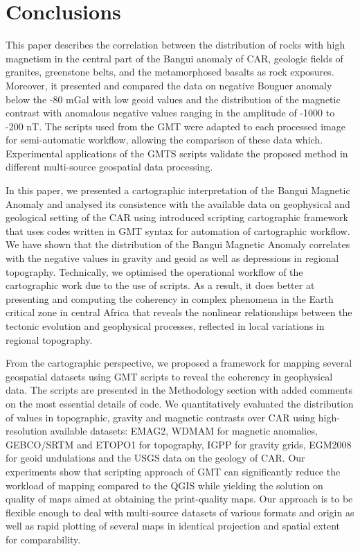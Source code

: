 \documentclass[minerals,article,submit,pdftex,moreauthors]{Definitions/mdpi}
\begin{document}
\section{Conclusions}

This paper describes the correlation between the distribution of rocks with high magnetism in the central part of the Bangui anomaly of CAR, geologic fields of granites, greenstone belts, and the metamorphosed basalts as rock exposures. Moreover, it presented and compared the data on negative Bouguer anomaly below the -80 mGal with low geoid values and the distribution of the magnetic contrast with anomalous negative values ranging in the amplitude of -1000 to -200 nT. The scripts used from the GMT were adapted to each processed image for semi-automatic workflow, allowing the comparison of these data which. Experimental applications of the GMTS scripts validate the proposed method in different multi-source geospatial data processing.  

In this paper, we presented a cartographic interpretation of the Bangui Magnetic Anomaly and analysed its consistence with the available data on geophysical and geological setting of the CAR using introduced scripting cartographic framework that uses codes written in GMT syntax for automation of cartographic workflow. We have shown that the distribution of the Bangui Magnetic Anomaly correlates with the negative values in gravity and geoid as well as depressions in regional topography. Technically, we optimised the operational workflow of the cartographic work due to the use of scripts. As a result, it does better at presenting and computing the coherency in complex phenomena in the Earth critical zone in central Africa that reveals the nonlinear relationships between the tectonic evolution and geophysical processes, reflected in local variations in regional topography.

From the cartographic perspective, we proposed a framework for mapping several geospatial datasets using GMT scripts to reveal the coherency in geophysical data. The scripts are presented in the Methodology section with added comments on the most essential details of code. We quantitatively evaluated the distribution of values in topographic, gravity and magnetic contrasts over CAR using high-resolution available datasets: EMAG2, WDMAM for magnetic anomalies, GEBCO/SRTM and ETOPO1 for topography, IGPP for gravity grids, EGM2008 for geoid undulations and the USGS data on the geology of CAR. Our experiments show that scripting approach of GMT can significantly reduce the workload of mapping compared to the QGIS while yielding the solution on quality of maps aimed at obtaining the print-quality maps. Our approach is to be flexible enough to deal with multi-source datasets of various formats and origin as well as rapid plotting of several maps in identical projection and spatial extent for comparability. 
\end{document}
